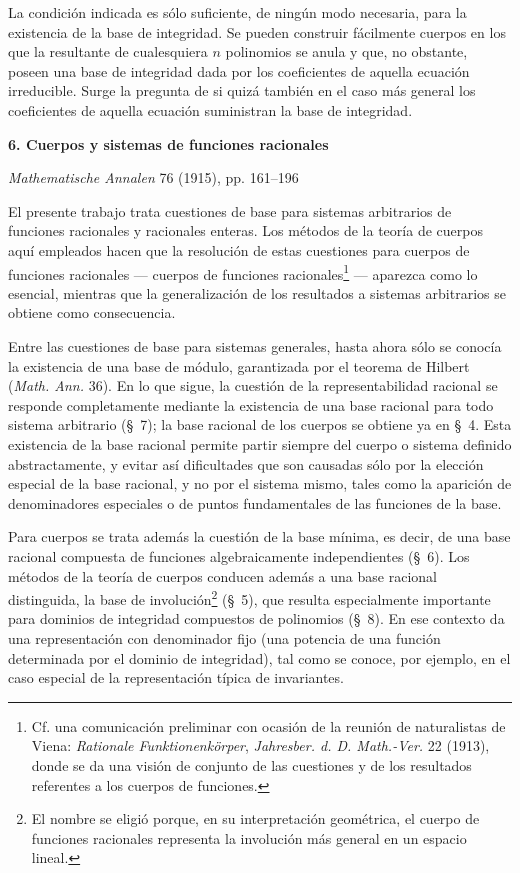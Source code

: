 \documentclass[11pt]{article}
\begin{document}
La condición indicada es sólo suficiente, de ningún modo necesaria, para la existencia de la base de integridad. Se pueden construir fácilmente cuerpos en los que la resultante de cualesquiera $n$ polinomios se anula y que, no obstante, poseen una base de integridad dada por los coeficientes de aquella ecuación irreducible. Surge la pregunta de si quizá también en el caso más general los coeficientes de aquella ecuación suministran la base de integridad.

\clearpage

\begin{center}
{\Large\bfseries 6. Cuerpos y sistemas de funciones racionales}\par
\vspace{1.2em}
\emph{Mathematische Annalen} 76 (1915), pp. 161--196
\end{center}

\vspace{1.5em}

El presente trabajo trata cuestiones de base para sistemas arbitrarios de funciones racionales y racionales enteras. Los métodos de la teoría de cuerpos aquí empleados hacen que la resolución de estas cuestiones para cuerpos de funciones racionales --- cuerpos de funciones racionales\footnote{Cf. una comunicación preliminar con ocasión de la reunión de naturalistas de Viena: \emph{Rationale Funktionenkörper}, \emph{Jahresber. d. D. Math.-Ver.} 22 (1913), donde se da una visión de conjunto de las cuestiones y de los resultados referentes a los cuerpos de funciones.} --- aparezca como lo esencial, mientras que la generalización de los resultados a sistemas arbitrarios se obtiene como consecuencia.

Entre las cuestiones de base para sistemas generales, hasta ahora sólo se conocía la existencia de una base de módulo, garantizada por el teorema de Hilbert (\emph{Math. Ann.} 36). En lo que sigue, la cuestión de la representabilidad racional se responde completamente mediante la existencia de una base racional para todo sistema arbitrario (\S\ 7); la base racional de los cuerpos se obtiene ya en \S\ 4. Esta existencia de la base racional permite partir siempre del cuerpo o sistema definido abstractamente, y evitar así dificultades que son causadas sólo por la elección especial de la base racional, y no por el sistema mismo, tales como la aparición de denominadores especiales o de puntos fundamentales de las funciones de la base.

Para cuerpos se trata además la cuestión de la base mínima, es decir, de una base racional compuesta de funciones algebraicamente independientes (\S\ 6). Los métodos de la teoría de cuerpos conducen además a una base racional distinguida, la base de involución\footnote{El nombre se eligió porque, en su interpretación geométrica, el cuerpo de funciones racionales representa la involución más general en un espacio lineal.} (\S\ 5), que resulta especialmente importante para dominios de integridad compuestos de polinomios (\S\ 8). En ese contexto da una representación con denominador fijo (una potencia de una función determinada por el dominio de integridad), tal como se conoce, por ejemplo, en el caso especial de la representación típica de invariantes.
\end{document}
